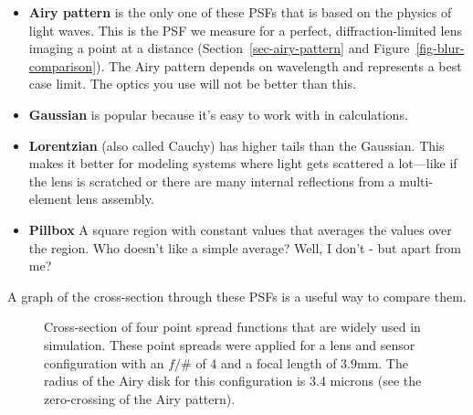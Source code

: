 \documentclass[
  letterpaper,
]{book}
\providecommand{\tightlist}{%
  \setlength{\itemsep}{0pt}\setlength{\parskip}{0pt}}\usepackage{longtable,booktabs,array}
\begin{document}
\begin{itemize}
\tightlist
\item
  \textbf{Airy pattern} is the only one of these PSFs that is based on
  the physics of light waves. This is the PSF we measure for a perfect,
  diffraction-limited lens imaging a point at a distance
  (Section~\ref{sec-airy-pattern} and Figure~\ref{fig-blur-comparison}).
  The Airy pattern depends on wavelength and represents a best case
  limit. The optics you use will not be better than this.
\item
  \textbf{Gaussian} is popular because it's easy to work with in
  calculations.
\item
  \textbf{Lorentzian} (also called Cauchy) has higher tails than the
  Gaussian. This makes it better for modeling systems where light gets
  scattered a lot---like if the lens is scratched or there are many
  internal reflections from a multi-element lens assembly.
\item
  \textbf{Pillbox} A square region with constant values that averages
  the values over the region. Who doesn't like a simple average? Well, I
  don't - but apart from me?
\end{itemize}

A graph of the cross-section through these PSFs is a useful way to
compare them.

\begin{figure}


\caption{\label{fig-psf-graph}Cross-section of four point spread
functions that are widely used in simulation. These point spreads were
applied for a lens and sensor configuration with an \(f/\#\) of 4 and a
focal length of 3.9mm. The radius of the Airy disk for this
configuration is 3.4 microns (see the zero-crossing of the Airy
pattern).}

\end{figure}%
\end{document}
